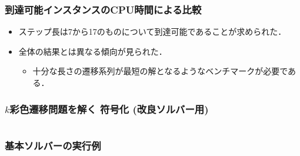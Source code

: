 \begin{frame}
  \frametitle{到達可能インスタンスのCPU時間による比較}

  \begin{exampleblock}{}
    \centering
    \scalebox{0.75}{}
  \end{exampleblock}
  \begin{itemize}
    \item ステップ長は7から17のものについて到達可能であることが求められた．
    \item 全体の結果とは異なる傾向が見られた．
      \begin{itemize}
        \item 十分な長さの遷移系列が最短の解となるようなベンチマークが必要である．
      \end{itemize}
  \end{itemize}
\end{frame}
\begin{frame}[shrink]
  \frametitle{$k$彩色遷移問題を解く 符号化 {\small(改良ソルバー用)}}

\begin{columns}[t]
\begin{column}{0.9\linewidth}
\begin{exampleblock}{}
 
\end{exampleblock}    
\end{column}
\end{columns}
\end{frame}
\begin{frame}[shrink]
  \frametitle{基本ソルバーの実行例}

\begin{exampleblock}{}
 
\end{exampleblock}    
  
\end{frame}
